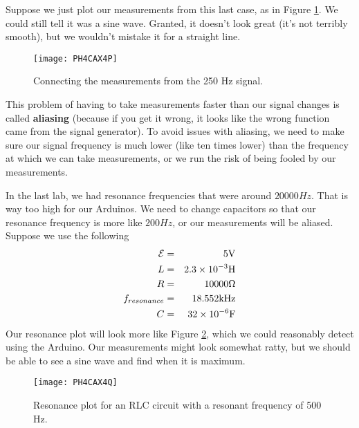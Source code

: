 Suppose we just plot our measurements from this last case, as in
Figure \ref{fig:sine5}. We could still tell it was a sine
wave. Granted, it doesn't look great (it's not terribly smooth),
but we wouldn't mistake it for a straight line. 
\begin{figure}[htbp!]
	\centering
\texttt{[image: PH4CAX4P]}
	\caption{Connecting the measurements from the 250 Hz signal.}
	\label{fig:sine5}
\end{figure}

This problem of having to
take measurements faster than our signal changes is called 
\textbf{aliasing} (because
if you get it wrong, it looks like the wrong function came from the signal
generator). To avoid issues with aliasing, we need to make sure our 
signal frequency is much lower (like
ten times lower) than the frequency at which we can take measurements, 
or we run the risk of being fooled by our measurements.

In the last lab, we had resonance frequencies that were around $%
20000\unit{Hz}.$ That is way too high for our Arduinos. We need to change
capacitors so that our resonance frequency is more like $200\unit{Hz}$, or
our measurements will be aliased. Suppose we use the following 
\begin{eqnarray*}
\mathcal{E} &=&5\unit{V} \\
L &=&2.3\times 10^{-3}\unit{H} \\
R &=&10000\unit{%
\Omega%
} \\
f_{resonance} &=&18.552\unit{kHz} \\
C &=&32\times 10^{-6}\unit{F}
\end{eqnarray*}
Our resonance plot will look more like Figure \ref{fig:res2},
which we could reasonably detect using the Arduino.
Our measurements might look somewhat ratty, but we should be able to
see a sine wave and find when it is maximum.
\begin{figure}[htbp!]
	\centering
\texttt{[image: PH4CAX4Q]}
	\caption{Resonance plot for an RLC circuit with a resonant frequency of
	500 Hz.}
	\label{fig:res2}
\end{figure}


